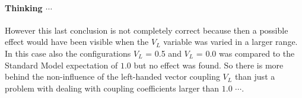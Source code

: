 \paragraph{Thinking $\cdots$ \\} 
However this last conclusion is not completely correct because then a possible effect would have been visible when the $V_L$ variable was varied in a larger range. In this case also the configurations $V_L$ = 0.5 and $V_L$ = 0.0 was compared to the Standard Model expectation of $1.0$ but no effect was found. So there is more behind the non-influence of the left-handed vector coupling $V_L$ than just a problem with dealing with coupling coefficients larger than $1.0$ $\cdots$.